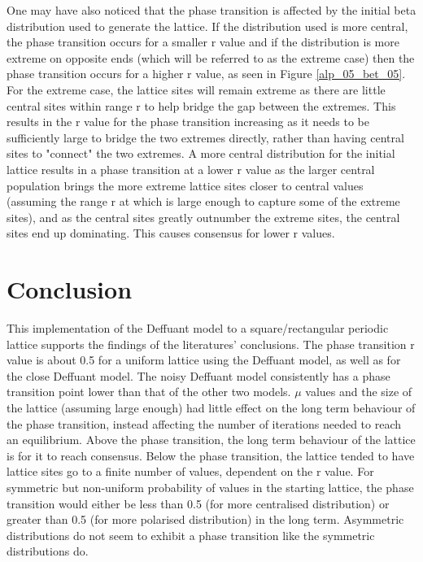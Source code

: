 One may have also noticed that the phase transition is affected by the initial beta distribution used to generate the lattice. If the distribution used is more central, the phase transition occurs for a smaller r value and if the distribution is more extreme on opposite ends (which will be referred to as the extreme case) then the phase transition occurs for a higher r value, as seen in Figure \ref{alp_05_bet_05}. For the extreme case, the lattice sites will remain extreme as there are little central sites within range r to help bridge the gap between the extremes. This results in the r value for the phase transition increasing as it needs to be sufficiently large to bridge the two extremes directly, rather than having central sites to "connect" the two extremes. A more central distribution for the initial lattice results in a phase transition at a lower r value as the larger central population brings the more extreme lattice sites closer to central values (assuming the range r at which is large enough to capture some of the extreme sites), and as the central sites greatly outnumber the extreme sites, the central sites end up dominating. This causes consensus for lower r values.

\section{Conclusion}
This implementation of the Deffuant model to a square/rectangular periodic lattice supports the findings of the literatures' conclusions. The phase transition r value is about 0.5 for a uniform lattice using the Deffuant model, as well as for the close Deffuant model. The noisy Deffuant model consistently has a phase transition point lower than that of the other two models. $\mu$ values and the size of the lattice (assuming large enough) had little effect on the long term behaviour of the phase transition, instead affecting the number of iterations needed to reach an equilibrium. Above the phase transition, the long term behaviour of the lattice is for it to reach consensus. Below the phase transition, the lattice tended to have lattice sites go to a finite number of values, dependent on the r value. For symmetric but non-uniform probability of values in the starting lattice, the phase transition would either be less than 0.5 (for more centralised distribution) or greater than 0.5 (for more polarised distribution) in the long term. Asymmetric distributions do not seem to exhibit a phase transition like the symmetric distributions do.